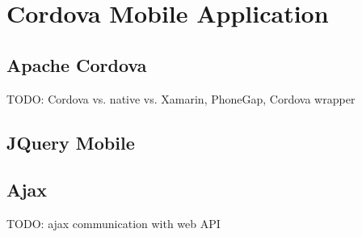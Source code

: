\section{Cordova Mobile Application}
\subsection{Apache Cordova}
TODO: Cordova vs. native vs. Xamarin, PhoneGap, Cordova wrapper
\subsection{JQuery Mobile}
\subsection{Ajax}
TODO: ajax communication with web API


